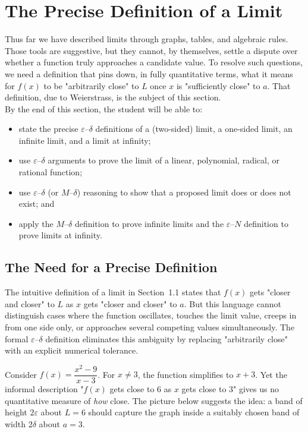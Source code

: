 \section{The Precise Definition of a Limit}
\label{sec:1.4}

Thus far we have described limits through graphs, tables, and algebraic rules. Those tools are suggestive, but they cannot, by themselves, settle a dispute over whether a function truly approaches a candidate value. To resolve such questions, we need a definition that pins down, in fully quantitative terms, what it means for \(f(x)\) to be "arbitrarily close" to \(L\) once \(x\) is "sufficiently close" to \(a\). That definition, due to Weierstrass, is the subject of this section. \\

By the end of this section, the student will be able to:
\begin{itemize}
    \item state the precise \(\varepsilon\)--\(\delta\) definitions of a (two-sided) limit, a one-sided limit, an infinite limit, and a limit at infinity;
    \item use \(\varepsilon\)--\(\delta\) arguments to prove the limit of a linear, polynomial, radical, or rational function;
    \item use \(\varepsilon\)--\(\delta\) (or \(M\)--\(\delta\)) reasoning to show that a proposed limit does or does not exist; and
    \item apply the \(M\)--\(\delta\) definition to prove infinite limits and the \(\varepsilon\)--\(N\) definition to prove limits at infinity.
\end{itemize}

\subsection*{The Need for a Precise Definition}
\label{subsec:1.4.1}

The intuitive definition of a limit in Section~1.1 states that \(f(x)\) gets "closer and closer" to \(L\) as \(x\) gets "closer and closer" to \(a\). But this language cannot distinguish cases where the function oscillates, touches the limit value, creeps in from one side only, or approaches several competing values simultaneously. The formal \(\varepsilon\)--\(\delta\) definition eliminates this ambiguity by replacing "arbitrarily close" with an explicit numerical tolerance.

Consider \(f(x)=\dfrac{x^{2}-9}{x-3}\). For \(x\neq 3\), the function simplifies to \(x+3\). Yet the informal description "\(f(x)\) gets close to \(6\) as \(x\) gets close to \(3\)" gives us no quantitative measure of \emph{how} close. The picture below suggests the idea: a band of height \(2\varepsilon\) about \(L=6\) should capture the graph inside a suitably chosen band of width \(2\delta\) about \(a=3\).

